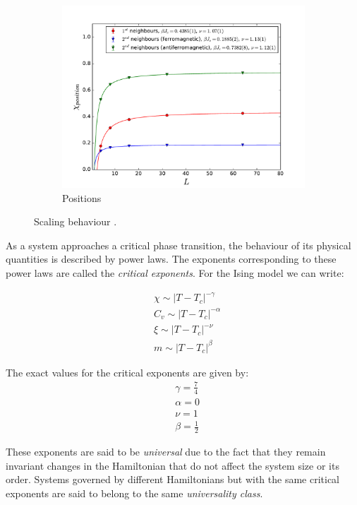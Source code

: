 \documentclass[twoside]{article}
\begin{document}
\begin{multicols}{2}
\begin{figure}[!tpb]
    \begin{subfigure}[b]{0.32\textwidth}
    \includegraphics[width=\textwidth]{images/plot_pos.pdf}
    \caption{Positions}
    \label{scaling_pos}
  \end{subfigure}
  \caption{Scaling behaviour .}
  \label{scaling}
\end{figure}

As a system approaches a critical phase transition, the behaviour of its physical quantities is described by power laws. The exponents corresponding to these power laws are called the \emph{critical exponents}. For the Ising model we can write:

\begin{align}
&\chi \sim |T-T_c|^{-\gamma} \\
& C_v \sim |T-T_c|^{-\alpha} \\
& \xi \sim |T-T_c|^{-\nu} \\
& m \sim |T-T_c|^{\beta}
\end{align}

The exact values for the critical exponents are given by:
\begin{align}
&\gamma = \frac{7}{4} \\
&\alpha = 0 \\
&\nu = 1\\
&\beta = \frac{1}{2} 
\end{align}

\noindent These exponents are said to be \emph{universal} due to the fact that they remain invariant changes in the Hamiltonian that do not affect the system size or its order. Systems governed by different Hamiltonians but with the same critical exponents are said to belong to the same \emph{universality class}. 


\end{multicols}
\end{document}
